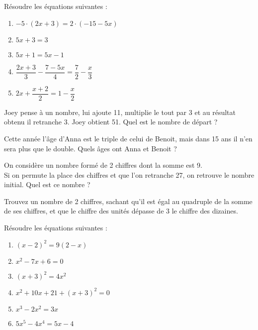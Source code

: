 

\begin{exercice}
Résoudre les équations suivantes :
\begin{enumerate}
\item $-5 \cdot (2x+3)=2 \cdot (-15-5x)$
\item $5x+3=3$
\item $5x+1=5x-1$
\item $\dfrac{2x+3}{3}-\dfrac{7-5x}{4}=\dfrac{7}{2}-\dfrac{x}{3}$
\item $2x+\dfrac{x+2}{2}=1-\dfrac{x}{2}$
\end{enumerate}

\end{exercice}


\begin{exercice}
Joey pense à un nombre, lui ajoute 11, multiplie le tout par 3 et au résultat obtenu il retranche 3. Joey obtient 51. Quel est le nombre de départ ?
\end{exercice}

\begin{exercice}
Cette année l’âge d’Anna  est le triple de celui de Benoit, mais dans 15 ans il n’en 	sera plus que le double. Quels âges ont Anna et Benoit ?
\end{exercice}

\begin{exercice}
On considère un nombre formé de 2 chiffres dont la somme est 9.\\
Si on permute la place des chiffres et que l’on retranche 27, on retrouve le nombre 	initial. Quel est ce nombre ?
\end{exercice}

\begin{exercice}
Trouvez un nombre de 2 chiffres, sachant qu'il est égal au quadruple de la somme de ses chiffres, et que le chiffre des unités dépasse de 3 le chiffre des dizaines.
\end{exercice}

\begin{exercice}
Résoudre les équations suivantes :
\begin{enumerate}
\item $(x-2)^2=9(2-x)$
\item $x^2-7x+6=0$
\item $(x+3)^2=4x^2$
\item $x^2+10x+21+(x+3)^2=0$
\item $x^3-2x^2=3x$
\item $5x^5-4x^4=5x-4$
\end{enumerate}
\end{exercice}

